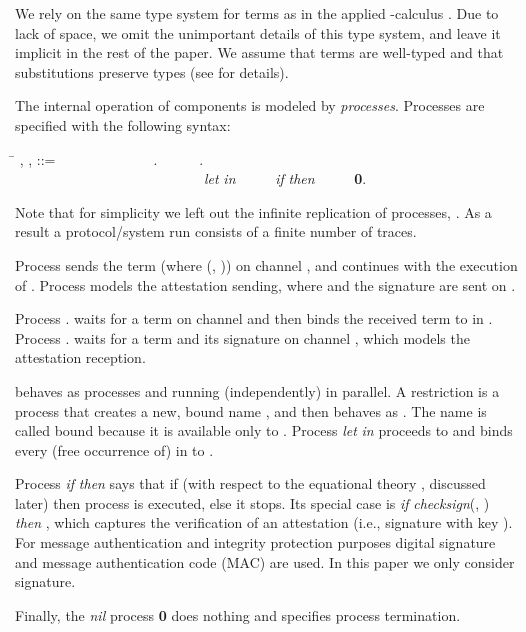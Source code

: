 \documentclass{llncs}
\begin{document}
We rely on the same type system for terms as in the applied -calculus \cite{fournet01mobile}. 
Due to lack of space, we omit the unimportant details of this type system, and 
leave it implicit in the rest of the paper. We assume that terms 
are well-typed and that substitutions preserve types (see \cite{ryan:2011} 
for details).

The internal operation of components is modeled by \textit{processes}. Processes 
are specified with the following syntax:

\small
\begin{tabbing}
    \=\kill
    \> , ,  ::=\ \ \ \ \ \ \ \ \ \ \ \ \ \ .\ \ \ \ \ \ .\ \ \ \ \ \ \\
    \>\ \ \ \ \ \ \ \ \ \ \ \ \ \ \ \ \ \ \ \ \ \ \ \ \ \ \  \textit{let}    \textit{in} \ \ \ \ \ \textit{if}  \textit{then} \ \ \ \ \ \textbf{0}.   
\end{tabbing}
\normalsize

Note that for simplicity we left out the infinite replication of processes, . As a result 
a protocol/system run consists of a finite number of traces. 

Process  sends the term  (where 
  (, )) on channel 
, and continues with the execution of .  
Process  models the attestation sending, where  
and the signature  are sent on . 

Process . waits for a term on channel  and then binds the 
received term to  in .   
Process . waits for a term  and its signature 
 on channel , which models the attestation reception. 

 behaves as processes  and  running (independently) in
parallel.     
A restriction  is a process that creates a new, bound name
, and then behaves as . The name  is called bound because it is available 
only to .    
Process  \textit{let}    \textit{in}  proceeds to  and binds
every (free occurrence of)  in  to . 
 
Process \textit{if}  \textit{then}  says that if 
   (with respect to the equational theory , discussed later) 
then process  is executed, else it stops.  
Its special case is \textit{if}   \textit{checksign}(, ) \textit{then} , which  
captures the verification of an attestation (i.e., signature  with key ). For message authentication and integrity protection purposes digital 
signature and message authentication code (MAC) are used. In this paper we 
only consider signature. 

Finally, the \textit{nil} process \textbf{0} does nothing and specifies process 
termination. 
\end{document}
